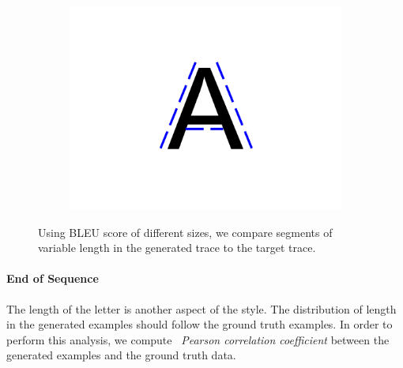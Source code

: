 \begin{figure}[!htbp]
\begin{subfigure}{0.3\textwidth}
        \includegraphics[scale=0.3, trim={10cm 7cm 10cm 7cm},clip]{images/gbem/bleu_score_3.png}
    \end{subfigure}

    \caption{Using BLEU score of different sizes, we compare segments of variable length in the generated trace to the target trace.}
    \label{fig:bleu_score}
\end{figure}

\paragraph{End of Sequence} The length of the letter is another aspect of the style. The distribution of length in the generated examples should follow the ground truth examples. In order to perform this analysis, we compute ~\textit{Pearson correlation coefficient} between the generated examples and the ground truth data.

